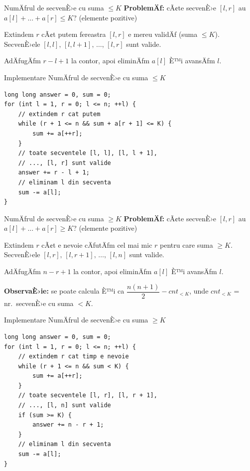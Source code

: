 ﻿\documentclass{beamer}
\begin{document}
\begin{frame}{NumÄƒrul de secvenÈ›e cu suma $\leq K$}
  \textbf{ProblemÄƒ:} cÃ¢te secvenÈ›e $[l, r]$ au $a[l] + \ldots + a[r] \leq K$? (elemente pozitive)

  \smallskip
  Extindem $r$ cÃ¢t putem \textemdash{} fereastra $[l, r]$ e mereu validÄƒ (suma $\leq K$).
  SecvenÈ›ele $[l, l],\, [l, l{+}1],\, \ldots,\, [l, r]$ sunt valide.

  \smallskip
  AdÄƒugÄƒm $r - l + 1$ la contor, apoi eliminÄƒm $a[l]$ È™i avansÄƒm $l$.
\end{frame}

\begin{frame}[fragile]{Implementare \textemdash{} NumÄƒrul de secvenÈ›e cu suma $\leq K$}
  \begin{lstlisting}
long long answer = 0, sum = 0;
for (int l = 1, r = 0; l <= n; ++l) {
    // extindem r cat putem
    while (r + 1 <= n && sum + a[r + 1] <= K) {
        sum += a[++r];
    }
    // toate secventele [l, l], [l, l + 1],
    // ..., [l, r] sunt valide
    answer += r - l + 1;
    // eliminam l din secventa
    sum -= a[l];
}
  \end{lstlisting}
\end{frame}

\begin{frame}{NumÄƒrul de secvenÈ›e cu suma $\geq K$}
  \textbf{ProblemÄƒ:} cÃ¢te secvenÈ›e $[l, r]$ au $a[l] + \ldots + a[r] \geq K$? (elemente pozitive)

  \smallskip
  Extindem $r$ cÃ¢t e nevoie \textemdash{} cÄƒutÄƒm cel mai mic $r$ pentru care suma $\geq K$.
  SecvenÈ›ele $[l, r],\, [l, r{+}1],\, \ldots,\, [l, n]$ sunt valide.

  \smallskip
  AdÄƒugÄƒm $n - r + 1$ la contor, apoi eliminÄƒm $a[l]$ È™i avansÄƒm $l$.

  \smallskip
  \textbf{ObservaÈ›ie:} se poate calcula È™i ca $\dfrac{n(n+1)}{2} - cnt_{< K}$, unde $cnt_{< K}$ = nr.\ secvenÈ›e cu suma $< K$.
\end{frame}

\begin{frame}[fragile]{Implementare \textemdash{} NumÄƒrul de secvenÈ›e cu suma $\geq K$}
  \begin{lstlisting}
long long answer = 0, sum = 0;
for (int l = 1, r = 0; l <= n; ++l) {
    // extindem r cat timp e nevoie
    while (r + 1 <= n && sum < K) {
        sum += a[++r];
    }
    // toate secventele [l, r], [l, r + 1],
    // ..., [l, n] sunt valide
    if (sum >= K) {
        answer += n - r + 1;
    }
    // eliminam l din secventa
    sum -= a[l];
}
  \end{lstlisting}
\end{frame}
\end{document}
